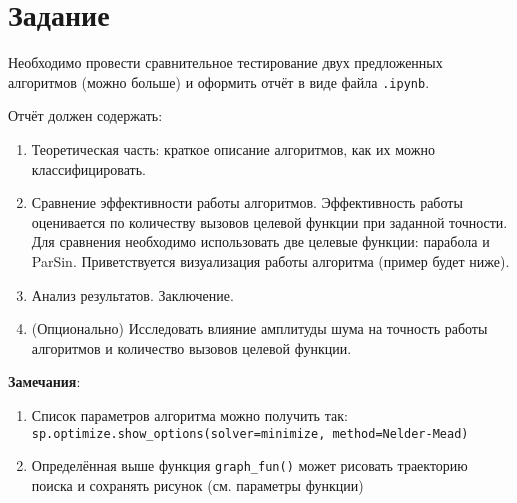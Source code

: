 \documentclass[11pt,a4paper]{article}
\providecommand{\tightlist}{%
      \setlength{\itemsep}{0pt}\setlength{\parskip}{0pt}}
\begin{document}
    \begin{center}
    \end{center}
    

    \hypertarget{ux437ux430ux434ux430ux43dux438ux435}{%
\section{Задание}\label{ux437ux430ux434ux430ux43dux438ux435}}

Необходимо провести сравнительное тестирование двух предложенных
алгоритмов (можно больше) и оформить отчёт в виде файла \texttt{.ipynb}.

Отчёт должен содержать:

\begin{enumerate}
\def\labelenumi{\arabic{enumi}.}
\tightlist
\item
  Теоретическая часть: краткое описание алгоритмов, как их можно
  классифицировать.
\item
  Сравнение эффективности работы алгоритмов. Эффективность работы
  оценивается по количеству вызовов целевой функции при заданной
  точности. Для сравнения необходимо использовать две целевые функции:
  парабола и ParSin. Приветствуется визуализация работы алгоритма
  (пример будет ниже).
\item
  Анализ результатов. Заключение.
\item
  (Опционально) Исследовать влияние амплитуды шума на точность работы
  алгоритмов и количество вызовов целевой функции.
\end{enumerate}

    \textbf{Замечания}:

\begin{flushleft}
  \begin{enumerate}
\def\labelenumi{\arabic{enumi}.}
\tightlist
\item
  Список параметров алгоритма можно получить так:
  \texttt{sp.optimize.show\_options(solver=\textquotesingle{}minimize\textquotesingle{},\ method=\textquotesingle{}Nelder-Mead\textquotesingle{})}
\item
  Определённая выше функция \texttt{graph\_fun()} может рисовать
  траекторию поиска и сохранять рисунок (см. параметры функции)
\end{enumerate}
\end{flushleft}
\end{document}
